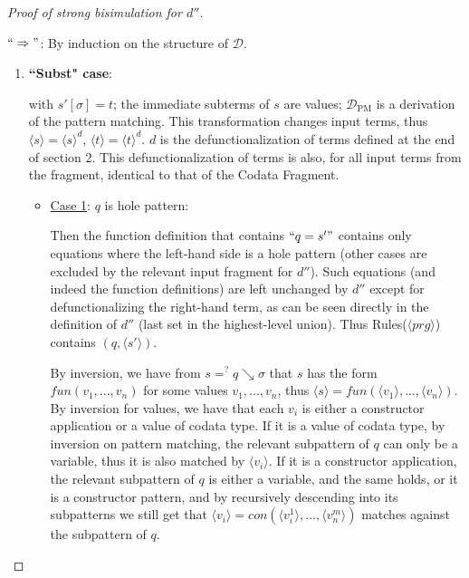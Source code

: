 \begin{proof}[Proof of strong bisimulation for $d''$] ~

$`` \Rightarrow "$: By induction on the structure of $\mathcal{D}$.

\begin{enumerate}
\item \textbf{``Subst" case}:

\begin{prooftree}
\end{prooftree}

with $s'[\sigma] = t$; the immediate subterms of $s$ are values; $\mathcal{D}_{\textrm{PM}}$ is a derivation of the pattern matching. This transformation changes input terms, thus $\langle s \rangle = \langle s \rangle^d$, $\langle t \rangle = \langle t \rangle^d$. $d$ is the defunctionalization of terms defined at the end of section 2. This defunctionalization of terms is also, for all input terms from the fragment, identical to that of the Codata Fragment.

\begin{itemize}

\item \underline{Case 1}: $q$ is hole pattern:

Then the function definition that contains $`` q = s' "$ contains only equations where the left-hand side is a hole pattern (other cases are excluded by the relevant input fragment for $d''$). Such equations (and indeed the function definitions) are left unchanged by $d''$ except for defunctionalizing the right-hand term, as can be seen directly in the definition of $d''$ (last set in the highest-level union). Thus Rules($\langle prg \rangle$) contains $(q, \langle s' \rangle)$.

By inversion, we have from $s =^? q \searrow \sigma$ that $s$ has the form $fun(v_1, ..., v_n)$ for some values $v_1, ..., v_n$, thus $\langle s \rangle = fun(\langle v_1 \rangle, ..., \langle v_n \rangle)$. By inversion for values, we have that each $v_i$ is either a constructor application or a value of codata type. If it is a value of codata type, by inversion on pattern matching, the relevant subpattern of $q$ can only be a variable, thus it is also matched by $\langle v_i \rangle$. If it is a constructor application, the relevant subpattern of $q$ is either a variable, and the same holds, or it is a constructor pattern, and by recursively descending into its subpatterns we still get that $\langle v_i \rangle = con(\langle v^1_i \rangle, ..., \langle v^m_n \rangle)$ matches against the subpattern of $q$.


\end{itemize}
\end{enumerate}
\end{proof}
